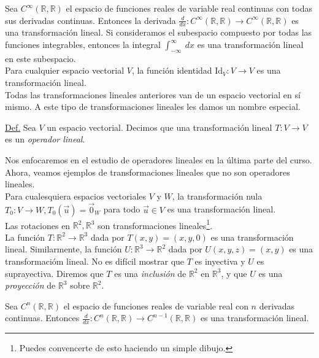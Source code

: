 \documentclass[apuntes]{subfiles}
\begin{document}
Sea $C^{\infty}(\mathbb{R},\mathbb{R})$ el espacio de funciones reales de variable real continuas con todas sus derivadas continuas. Entonces la derivada $\frac{d}{dx}:C^{\infty}(\mathbb{R},\mathbb{R})\to C^{\infty}(\mathbb{R},\mathbb{R})$ es una transformación lineal. Si consideramos el subespacio compuesto por todas las funciones integrables, entonces la integral $\int_{-\infty}^{\infty} \ dx$ es una transformación lineal en este subespacio. \\

Para cualquier espacio vectorial $V$, la función identidad $\text{Id}_{V}:V\to V$ es una transformación lineal. \\

Todas las transformaciones lineales anteriores van de un espacio vectorial en sí mismo. A este tipo de transformaciones lineales les damos un nombre especial.

\begin{tcolorbox}
\underline{Def.} Sea $V$ un espacio vectorial. Decimos que una transformación lineal $T:V\to V$ es un \emph{operador lineal}.
\end{tcolorbox}

\noindent Nos enfocaremos en el estudio de operadores lineales en la última parte del curso. Ahora, veamos ejemplos de transformaciones lineales que no son operadores lineales. \\

Para cualesquiera espacios vectoriales $V$ y $W$, la transformación nula $T_0:V\to W, T_0(\vec{u})=\vec{0}_W$ para todo $\vec{u}\in V$ es una transformación lineal. \\

Las rotaciones en $\mathbb{R}^2, \mathbb{R}^3$ son transformaciones lineales\footnote{Puedes convencerte de esto haciendo un simple dibujo.}. \\

La función $T:\mathbb{R}^2\to \mathbb{R}^3$ dada por $T(x,y) = (x,y,0)$ es una transformación lineal. Similarmente, la función $U:\mathbb{R}^3\to\mathbb{R}^2$ dada por $U(x,y,z) = (x,y)$ es una transformacióm lineal. No es difícil mostrar que $T$ es inyectiva y $U$ es suprayectiva. Diremos que $T$ es una \emph{inclusión} de $\mathbb{R}^2$ en $\mathbb{R}^3$, y que $U$ es una \emph{proyección} de $\mathbb{R}^3$ sobre $\mathbb{R}^2$.

Sea $C^n(\mathbb{R},\mathbb{R})$ el espacio de funciones reales de variable real con $n$ derivadas continuas. Entonces $\frac{d}{dx}:C^n(\mathbb{R},\mathbb{R})\to C^{n-1}(\mathbb{R},\mathbb{R})$ es una transformación lineal.
\end{document}
